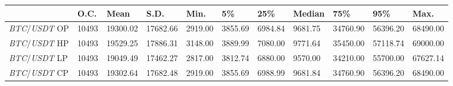 \begin{tabular}{lllllllllll}
\toprule
 & \textbf{O.C.} & \textbf{Mean} & \textbf{S.D.} & \textbf{Min.} & \textbf{5\%} & \textbf{25\%} & \textbf{Median} & \textbf{75\%} & \textbf{95\%} & \textbf{Max.} \\
\midrule
\emph{BTC}/\emph{USDT} OP & 10493 & 19300.02 & 17682.66 & 2919.00 & 3855.69 & 6984.84 & 9681.75 & 34760.90 & 56396.20 & 68490.00 \\
\emph{BTC}/\emph{USDT} HP & 10493 & 19529.25 & 17886.31 & 3148.00 & 3889.99 & 7080.00 & 9771.64 & 35450.00 & 57118.74 & 69000.00 \\
\emph{BTC}/\emph{USDT} LP & 10493 & 19049.49 & 17462.27 & 2817.00 & 3812.74 & 6880.00 & 9570.00 & 34210.00 & 55700.00 & 67627.14 \\
\emph{BTC}/\emph{USDT} CP & 10493 & 19302.64 & 17682.48 & 2919.00 & 3855.69 & 6988.99 & 9681.84 & 34760.90 & 56396.20 & 68490.00 \\
\bottomrule
\end{tabular}
